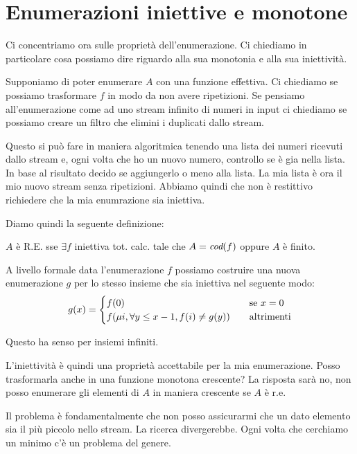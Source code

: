 \newpage

\section{Enumerazioni iniettive e monotone}

Ci concentriamo ora sulle proprietà dell'enumerazione. Ci chiediamo in particolare cosa possiamo
dire riguardo alla sua monotonia e alla sua iniettività.

Supponiamo di poter enumerare $A$ con una funzione effettiva. Ci chiediamo se possiamo trasformare
$f$ in modo da non avere ripetizioni. Se pensiamo all'enumerazione come ad uno stream infinito di
numeri in input ci chiediamo se possiamo creare un filtro che elimini i duplicati dallo stream.

Questo si può fare in maniera algoritmica tenendo una lista dei numeri ricevuti dallo stream e, ogni
volta che ho un nuovo numero, controllo se è gia nella lista. In base al risultato decido se
aggiungerlo o meno alla lista. La mia lista è ora il mio nuovo stream senza ripetizioni. Abbiamo
quindi che non è restittivo richiedere che la mia enumrazione sia iniettiva.

Diamo quindi la seguente definizione:

\begin{defn}
    $A$ è R.E. sse $\exists f$ iniettiva tot. calc. tale che $A = \textit{cod}(f)$ oppure $A$ è finito.
\end{defn}

A livello formale data l'enumerazione $f$ possiamo costruire una nuova enumerazione $g$ per lo
stesso insieme che sia iniettiva nel seguente modo:
\begin{equation*}
    g(x) =
    \begin{cases}
        f(0) \quad &\text{se $x = 0$} \\
        f(\mu i, \forall y \leq x-1, f(i) \not= g(y)) \quad &\text{altrimenti}
    \end{cases}
\end{equation*}

Questo ha senso per insiemi infiniti.

L'iniettività è quindi una proprietà accettabile per la mia enumerazione. Posso trasformarla anche
in una funzione monotona crescente? La risposta sarà no, non posso enumerare gli elementi di $A$ in
maniera crescente se $A$ è r.e.

Il problema è fondamentalmente che non posso assicurarmi che un dato elemento sia il più piccolo
nello stream. La ricerca divergerebbe. Ogni volta che cerchiamo un minimo c'è un problema del
genere.

